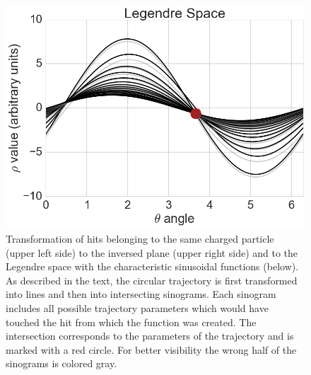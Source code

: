 \begin{figure}
 \vspace*{1cm}
 \includegraphics[scale=0.3]{figures/theory/legendre_3.png}
 \caption[Axial Legendre algorithm.]{Transformation of hits belonging to the same charged particle (upper left side) to the inversed plane (upper right side) and to the Legendre space with the characteristic sinusoidal functions (below). As described in the text, the circular trajectory is first transformed into lines and then into intersecting sinograms. Each sinogram includes all possible trajectory parameters which would have touched the hit from which the function was created. The intersection corresponds to the parameters of the trajectory and is marked with a red circle. For better visibility the wrong half of the sinograms is colored gray.}
 \label{fig-legendre-explained}
\end{figure}

